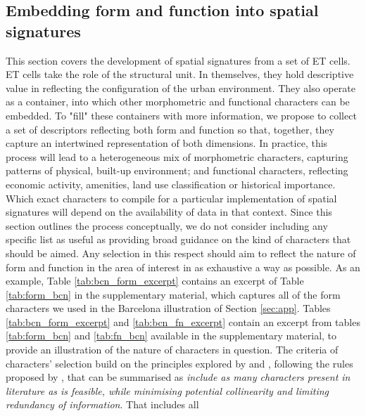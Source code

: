 \subsection{Embedding form and function into spatial signatures}
\label{ssec:ss_ff}

%
This section covers the development of spatial signatures from a set of ET cells.
ET cells take the role of the structural unit.
In themselves, they hold descriptive value in reflecting the configuration of
the urban environment. They also operate as a container, into which other
morphometric and functional characters can be embedded.
To "fill" these containers with more information,
we propose to collect a set of descriptors reflecting both form
and function so that, together, they capture an intertwined representation
of both dimensions.
%
In practice, this process will lead to a heterogeneous
mix of morphometric characters, capturing patterns of physical, built-up
environment; and functional characters, reflecting economic activity, amenities,
land use classification or historical importance.
%
Which exact characters to compile for a particular implementation of spatial signatures
will depend on the availability of data in that context.
Since this section outlines the process conceptually, we do not consider including any specific
list as useful as providing broad guidance on the kind of characters that should 
be aimed.
Any selection in this respect should aim to reflect the nature of form and function in the
area of interest in as exhaustive a way as possible.
As an example,
Table \ref{tab:bcn_form_excerpt} contains an excerpt of Table \ref{tab:form_bcn} in the supplementary
material, which captures all of the form characters we used in the Barcelona illustration of
Section \ref{sec:app}.
%
Tables \ref{tab:bcn_form_excerpt} and
\ref{tab:bcn_fn_excerpt} contain an excerpt from tables \ref{tab:form_bcn} and
\ref{tab:fn_bcn} available in the supplementary material, to provide an illustration of
the nature of characters in question. The criteria of characters' selection build on the
principles explored by \cite{dibble2019origin} and \cite{fleischmann2021methodological},
following the rules proposed by \cite{sneath1973numerical}, that can be summarised as
\emph{include as many characters present in literature as is feasible, while minimising
potential collinearity and limiting redundancy of information}. That includes all
